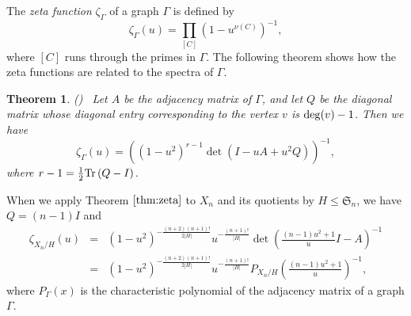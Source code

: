 \documentclass[lualatex,12pt]{article}
\newtheorem{thm}{Theorem}
\begin{document}
The {\em zeta function} $\zeta_{\Gamma}$ of a graph 
$\Gamma$ is defined by
\[
 \zeta_{\Gamma}(u) = 
 \prod_{[C]}
 \left(1-u^{\nu(C)}\right)^{-1},
\]
where $[C]$ runs through the primes in $\Gamma$.
The following theorem shows how the zeta functions
are related to the spectra of $\Gamma$.
\begin{thm}
 \label{thm:zeta}
 {\rm (\cite{ihara1966discrete, bass1992ihara})}
 ~Let $A$ be the adjacency matrix of $\Gamma$, and
 let $Q$ be the diagonal matrix
 whose diagonal entry corresponding to the vertex $v$ is ${\rm deg}(v)-1$.
 Then we have
 \[
  \zeta_{\Gamma}(u)
 =
 \left(
 (1-u^2)^{r-1}
 \det\left(I - uA + u^2Q\right)\right)^{-1},
 \]
 where $r-1=\frac{1}{2}{\rm Tr}\left(Q-I\right)$.
\end{thm}
When we apply Theorem $\ref{thm:zeta}$ to $X_n$ and its quotients
by $H\leq {\mathfrak S}_n$,
we have $Q=(n-1)I$ and
\begin{eqnarray}
 \zeta_{X_n/H}(u) & = & 
  (1-u^2)^{-\frac{(n+2)(n+1)!}{2|H|}}u^{-\frac{(n+1)!}{|H|}}
 \det\left(\frac{(n-1)u^2+1}{u}I-A\right)^{-1}\\
 & = & 
  (1-u^2)^{-\frac{(n+2)(n+1)!}{2|H|}}u^{-\frac{(n+1)!}{|H|}}%
  P_{X_n/H}\left(\frac{(n-1)u^2+1}{u}\right)^{-1},
 \label{eq:zetacharacteristic}
\end{eqnarray}
where $P_{\Gamma}(x)$ is the characteristic polynomial
of the adjacency matrix of a graph $\Gamma$.
\end{document}
